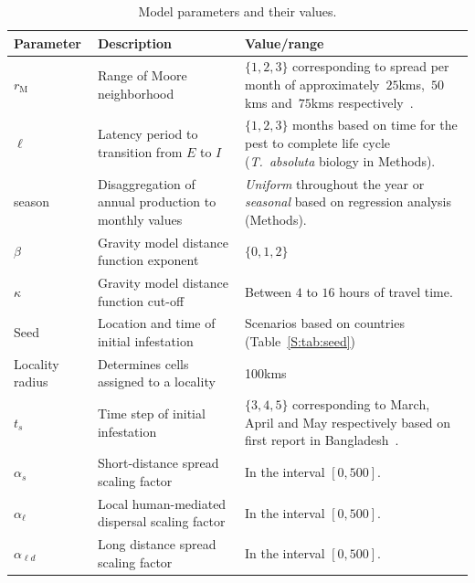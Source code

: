 \documentclass[11pt]{article}
\newcommand{\tuta}{\emph{T.~absoluta}}
\newcommand{\infest}{\rho}
\newcommand{\suitable}{\epsilon}
\newcommand{\asd}{\alpha_s}
\newcommand{\afm}{\alpha_{\ell}}
\newcommand{\ald}{\alpha_{\ell d}}
\newcommand{\mooreRange}{r_\mathrm{M}}
\theoremstyle{definition}
\begin{document}
\begin{table}[t]
\caption{Model parameters and their values.\label{tab:param}}
    \centering
	\small
{} %
    \begin{tabular}{p{}p{}p{}}
		\hline		
		Parameter & Description & Value/range \\
\hline		
\hline
$\mooreRange$ & Range of Moore neighborhood & $\{1,2,3\}$ corresponding to
spread per month of 
approximately~$25$kms,~$50$kms and~$75$kms
respectively~\cite{guimapi2016modeling,martins2018assessing}. \\
$\ell$ & Latency period to transition from $E$ to $I$ & $\{1,2,3\}$ months
based on time for the pest to complete life cycle (\tuta{} biology in
Methods). \\
season & Disaggregation of annual production to monthly values
& \emph{Uniform} throughout the year or \emph{seasonal} based on regression
analysis (Methods). \\
$\beta$ & Gravity model distance function exponent & $\{0,1,2\}$ \\
$\kappa$ & Gravity model distance function cut-off & Between $4$ to $16$ hours
of travel time. \\
Seed & Location and time of initial infestation & Scenarios based on
countries (Table~\ref{S:tab:seed})\\
Locality radius & Determines cells assigned to a locality & 100kms \\\hline
$t_s$ & Time step of initial infestation & $\{3,4,5\}$ corresponding
to March, April and May respectively based on first report in
Bangladesh~\cite{hossain2016first}. \\
$\asd$ & Short-distance spread scaling factor & In the interval $[0,500]$.\\
$\afm$ & Local human-mediated dispersal scaling factor & In the interval $[0,500]$.\\
$\ald$ & Long distance spread scaling factor & In the interval $[0,500]$.\\
\hline
\end{tabular}
\end{table}
\end{document}

